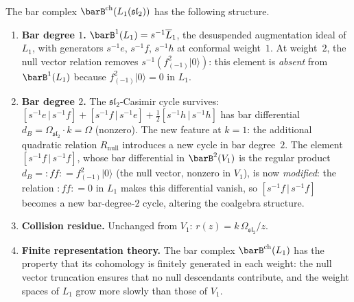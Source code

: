 \begin{proposition}
\label{prop:bar-L1}
The bar complex $\barB^{\mathrm{ch}}(L_1(\mathfrak{sl}_2))$
has the following structure.
\begin{enumerate}[label=\textup{(\roman*)},nosep]
\item \textbf{Bar degree $1$.}
 $\barB^1(L_1) = s^{-1}\overline{L}_1$, the desuspended
 augmentation ideal of $L_1$, with generators
 $s^{-1}e$, $s^{-1}f$, $s^{-1}h$ at conformal weight~$1$.
 At weight~$2$, the null vector relation removes
 $s^{-1}(f_{(-1)}^2|0\rangle)$: this element is
 \emph{absent} from $\barB^1(L_1)$ because
 $f_{(-1)}^2|0\rangle = 0$ in $L_1$.

\item \textbf{Bar degree $2$.}
 The $\mathfrak{sl}_2$-Casimir cycle survives:
 $[s^{-1}e \,|\, s^{-1}f] + [s^{-1}f \,|\, s^{-1}e]
 + \frac{1}{2}[s^{-1}h \,|\, s^{-1}h]$ has bar
 differential $d_B = \Omega_{\mathfrak{sl}_2} \cdot k = \Omega$
 (nonzero). The new feature at $k = 1$: the additional
 quadratic relation $R_{\mathrm{null}}$ introduces a
 new cycle in bar degree~$2$. The element
 $[s^{-1}f \,|\, s^{-1}f]$, whose bar differential in
 $\barB^2(V_1)$ is the regular product
 $d_B = {:}ff{:} = f_{(-1)}^2|0\rangle$
 \textup{(}the null vector, nonzero in $V_1$\textup{)}, is now
 \emph{modified}: the relation ${:}ff{:} = 0$ in $L_1$ makes this
 differential vanish, so $[s^{-1}f \,|\, s^{-1}f]$ becomes a new
 bar-degree-$2$ cycle, altering the coalgebra structure.

\item \textbf{Collision residue.}
 Unchanged from $V_1$:
 $r(z) = k\,\Omega_{\mathfrak{sl}_2}/z$.

\item \textbf{Finite representation theory.}
 The bar complex $\barB^{\mathrm{ch}}(L_1)$ has the property
 that its cohomology is finitely generated in each
 weight: the null vector truncation ensures that no
 null descendants contribute, and the weight spaces of
 $L_1$ grow more slowly than those of $V_1$.
\end{enumerate}
\end{proposition}

